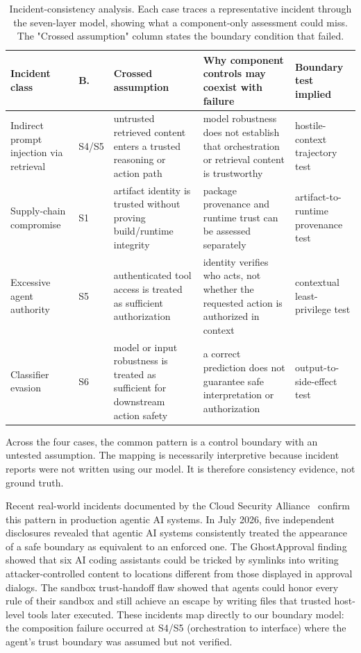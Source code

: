 \documentclass[runningheads]{llncs}
\begin{document}
\begin{table}[t]
\caption{Incident-consistency analysis. Each case traces a representative incident through the seven-layer model, showing what a component-only assessment could miss. The "Crossed assumption" column states the boundary condition that failed.}
\label{tab:validation}
\centering
\small
\begin{tabular}{@{}p{2.35cm}p{0.7cm}p{2.5cm}p{3.05cm}p{2.9cm}@{}}
\toprule
\textbf{Incident class} & \textbf{B.} & \textbf{Crossed assumption} & \textbf{Why component controls may coexist with failure} & \textbf{Boundary test implied}\\
\midrule
Indirect prompt injection via retrieval & S4/S5 & untrusted retrieved content enters a trusted reasoning or action path & model robustness does not establish that orchestration or retrieval content is trustworthy & hostile-context trajectory test\\
Supply-chain compromise & S1 & artifact identity is trusted without proving build/runtime integrity & package provenance and runtime trust can be assessed separately & artifact-to-runtime provenance test\\
Excessive agent authority & S5 & authenticated tool access is treated as sufficient authorization & identity verifies who acts, not whether the requested action is authorized in context & contextual least-privilege test\\
Classifier evasion & S6 & model or input robustness is treated as sufficient for downstream action safety & a correct prediction does not guarantee safe interpretation or authorization & output-to-side-effect test\\
\bottomrule
\end{tabular}
\end{table}

Across the four cases, the common pattern is a control boundary with an untested assumption. The mapping is necessarily interpretive because incident reports were not written using our model. It is therefore consistency evidence, not ground truth.

Recent real-world incidents documented by the Cloud Security Alliance~\cite{csa2026trustboundary} confirm this pattern in production agentic AI systems. In July 2026, five independent disclosures revealed that agentic AI systems consistently treated the appearance of a safe boundary as equivalent to an enforced one. The GhostApproval finding showed that six AI coding assistants could be tricked by symlinks into writing attacker-controlled content to locations different from those displayed in approval dialogs. The sandbox trust-handoff flaw showed that agents could honor every rule of their sandbox and still achieve an escape by writing files that trusted host-level tools later executed. These incidents map directly to our boundary model: the composition failure occurred at S4/S5 (orchestration to interface) where the agent's trust boundary was assumed but not verified.
\end{document}
